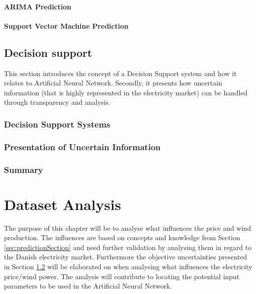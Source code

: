 \documentclass[twoside,11pt,openright]{report}
\begin{document}
\subsubsection{ARIMA Prediction}
 
\subsubsection{Support Vector Machine Prediction}
\label{sec:svmPrediction}



\newpage

\section{Decision support}
This section introduces the concept of a Decision Support system and how it relates to Artificial Neural Network. Secondly, it presents how uncertain information (that is highly represented in the electricity market) can be handled through transparency and analysis.  
\label{sec:dssAndUncertain}
\subsection{Decision Support Systems}
\label{sec:dssSection}

\subsection{Presentation of Uncertain Information}
\label{sec:uncertainInformation}

\subsection{Summary}



\chapter{Dataset Analysis}
\label{ch:theANNs}
The purpose of this chapter will be to analyse what influences the price and wind production. The influences are based on concepts and knowledge from Section \ref{sec:predictionSection} and need further validation by analysing them in regard to the Danish electricity market. Furthermore the objective uncertainties presented in Section \ref{sec:uncertainInformation} will be elaborated on when analysing what influences the electricity price/wind power. The analysis will contribute to locating the potential input parameters to be used in the Artificial Neural Network.
\end{document}
